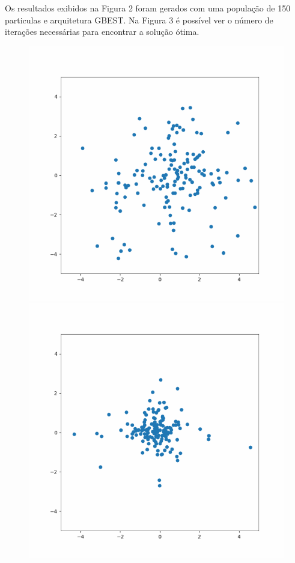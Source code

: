 \documentclass[conference]{IEEEtran}
\begin{document}
    Os resultados exibidos na Figura 2 foram gerados com uma população de 150 particulas e arquitetura GBEST. Na Figura 3 é possível ver o número de iterações necessárias para encontrar a solução ótima.
	\begin{figure}[htbp]
    \begin{center}
    	\includegraphics[scale=0.3]{imagens-pso/particle-swarm-optimization-01.png} 
        \includegraphics[scale=0.3]{imagens-pso/particle-swarm-optimization-02.png}

\end{center}
\end{figure}
\end{document}
